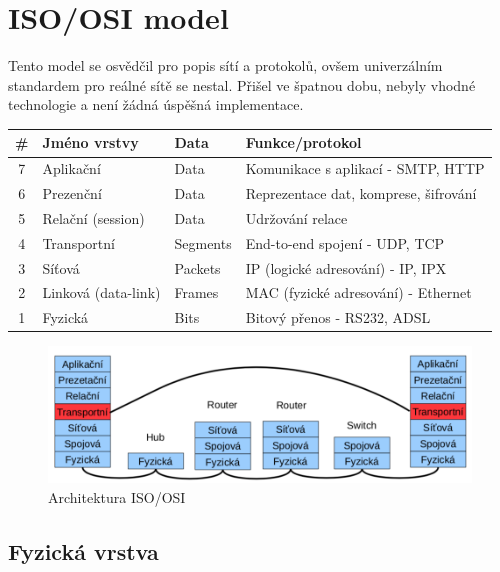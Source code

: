 \documentclass{szzclass}
\begin{document}


\hypertarget{isoosi-model}{%
\section{ISO/OSI model}\label{isoosi-model}}

Tento model se osvědčil pro popis sítí a protokolů, ovšem univerzálním
standardem pro reálné sítě se nestal. Přišel ve špatnou dobu, nebyly
vhodné technologie a není žádná úspěšná implementace.

\begin{longtable}[]{@{}clll@{}}
\toprule
\# & Jméno vrstvy & Data & Funkce/protokol\tabularnewline
\midrule
\endhead
7 & Aplikační & Data & Komunikace s aplikací - SMTP, HTTP\tabularnewline
6 & Prezenční & Data & Reprezentace dat, komprese,
šifrování\tabularnewline
5 & Relační (session) & Data & Udržování relace\tabularnewline
4 & Transportní & Segments & End-to-end spojení - UDP,
TCP\tabularnewline
3 & Síťová & Packets & IP (logické adresování) - IP, IPX\tabularnewline
2 & Linková (data-link) & Frames & MAC (fyzické adresování) -
Ethernet\tabularnewline
1 & Fyzická & Bits & Bitový přenos - RS232, ADSL\tabularnewline
\bottomrule
\end{longtable}

\begin{figure}[h]
\centering
\includegraphics[width=\textwidth]{topics/bi-spol-23/images/ISO-OSI-Architektura.png}
\caption{Architektura ISO/OSI}
\end{figure}

\hypertarget{fyzickuxe1-vrstva}{%
\subsection{Fyzická vrstva}\label{fyzickuxe1-vrstva}}
\end{document}
